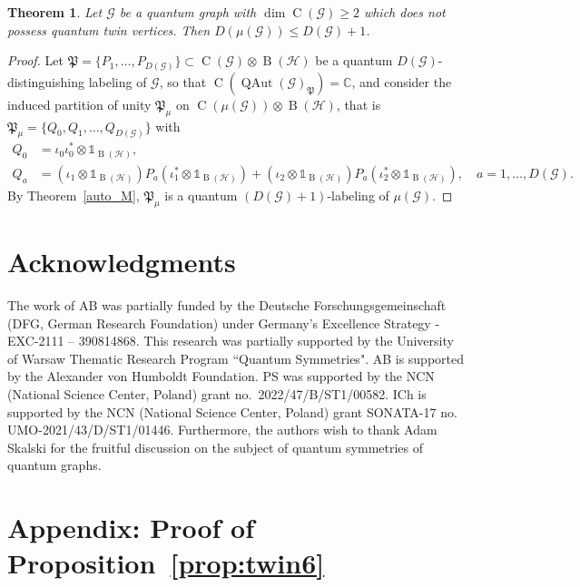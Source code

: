 \documentclass[11pt,reqno]{amsart}
\newtheorem{theorem}[proposition]{Theorem}
\newcommand{\I}{\mathds{1}}
\newcommand{\tens}{\otimes}
\newcommand{\CC}{\mathbb{C}}
\DeclareMathOperator{\QAut}{QAut}
\DeclareMathOperator{\B}{B}
\DeclareMathOperator{\C}{C}
\begin{document}
\begin{theorem}
Let $\mathcal{G}$ be a quantum graph with $\dim\C(\mathcal{G})\geq 2$ which does not possess quantum twin vertices. Then $D(\mu(\mathcal{G}))\leq D(\mathcal{G})+1$.
\end{theorem}
\begin{proof}
Let $\mathfrak{P}=\{P_1,\dotsc,P_{D(\mathcal{G})}\}\subset\C(\mathcal{G})\tens\B(\mathscr{H})$ be a quantum $D(\mathcal{G})$-distinguishing labeling of $\mathcal{G}$, so that $\C(\QAut(\mathcal{G})_{\mathfrak{P}})=\CC$, and consider the induced partition of unity $\mathfrak{P}_{\mu}$ on $\C(\mu(\mathcal{G}))\tens\B(\mathscr{H})$, that is $\mathfrak{P}_{\mu}=\{Q_0,Q_1,\ldots, Q_{D(\mathcal{G})}\}$ with
\[
\begin{aligned}
    Q_0&=\iota_0\iota^*_0\tens\I_{\B(\mathscr{H})},\\
    Q_a&=(\iota_1\tens\I_{\B(\mathscr{H})})P_a(\iota_1^*\tens\I_{\B(\mathscr{H})}) + (\iota_2\tens\I_{\B(\mathscr{H})})P_a(\iota_2^*\tens\I_{\B(\mathscr{H})}),\quad a=1,\dotsc,D(\mathcal{G}).
\end{aligned}
\]
By Theorem~\ref{auto_M}, $\mathfrak{P}_{\mu}$ is a quantum $(D(\mathcal{G})+1)$-labeling of $\mu(\mathcal{G})$.
\end{proof}


\section*{Acknowledgments}
The work of AB was partially funded by the Deutsche Forschungsgemeinschaft (DFG, German Research Foundation) under Germany’s Excellence Strategy - EXC-2111 – 390814868. This research was partially supported by the University of Warsaw Thematic Research Program ``Quantum Symmetries". AB is supported by the Alexander von Humboldt Foundation. PS was supported by the NCN (National Science Center, Poland) grant no.~2022/47/B/ST1/00582. ICh is supported by the NCN (National Science Center, Poland) grant SONATA-17 no.~
UMO-2021/43/D/ST1/01446. Furthermore, the authors wish to thank Adam Skalski for the fruitful discussion on the subject of quantum symmetries of quantum graphs.

\section{Appendix: Proof of Proposition~\ref{prop:twin6}}
\end{document}
